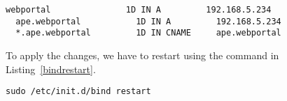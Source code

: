 \begin{lstlisting}[label=bindconf,caption=BIND configuration]
  webportal               1D IN A         192.168.5.234
  ape.webportal           1D IN A         192.168.5.234
  *.ape.webportal         1D IN CNAME     ape.webportal
\end{lstlisting}

To apply the changes, we have to restart  using the command in
Listing~\vref{bindrestart}.

\begin{lstlisting}[label=bindrestart,caption=BIND restart command]
  sudo /etc/init.d/bind restart
\end{lstlisting}


